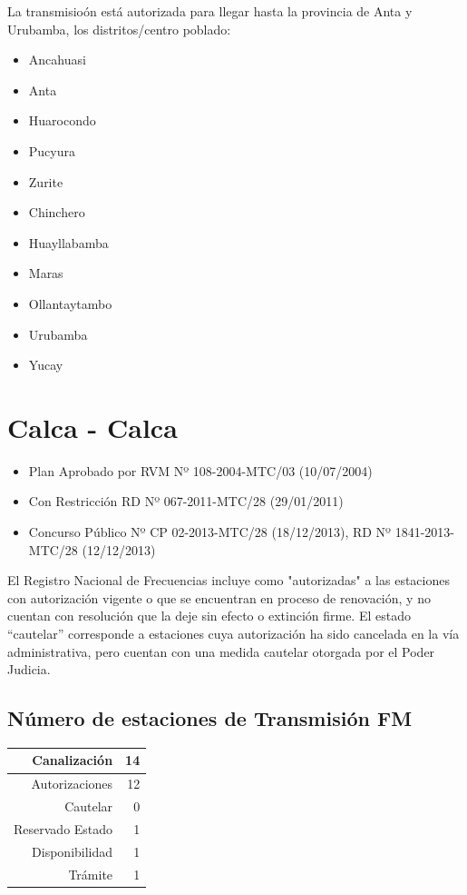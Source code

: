 \documentclass[11pt]{article}
\begin{document}
La transmisioón está autorizada para llegar hasta la provincia de Anta y Urubamba, los distritos/centro poblado:

\begin{itemize}
	\item Ancahuasi
	\item Anta 
	\item Huarocondo 
	\item Pucyura
	\item Zurite
	\item Chinchero
	\item Huayllabamba
	\item Maras
	\item Ollantaytambo
	\item Urubamba
	\item Yucay
\end{itemize}




\section{Calca - Calca}

\begin{itemize}
	\item Plan Aprobado por RVM Nº 108-2004-MTC/03 (10/07/2004)
	\item Con Restricción RD Nº 067-2011-MTC/28 (29/01/2011)
	\item Concurso Público Nº CP 02-2013-MTC/28 (18/12/2013), RD Nº 1841-2013-MTC/28 (12/12/2013)
\end{itemize}

El Registro Nacional de Frecuencias incluye como "autorizadas" a las estaciones con autorización vigente o que se encuentran en proceso de renovación, y no cuentan con resolución que la deje sin efecto o extinción firme. El estado “cautelar” corresponde a estaciones cuya autorización ha sido cancelada en la vía administrativa, pero cuentan con una medida cautelar otorgada por el Poder Judicia.

\subsection{Número de estaciones de Transmisión FM}

\begin{tabular}{|r|r|} \hline
	Canalización 			& 14 \\ \hline
	Autorizaciones			& 12 \\ \hline
	Cautelar				& 0 \\ \hline
	Reservado Estado		& 1 \\ \hline
	Disponibilidad			& 1 \\ \hline
	Trámite					& 1 \\ \hline 
\end{tabular}
\end{document}

